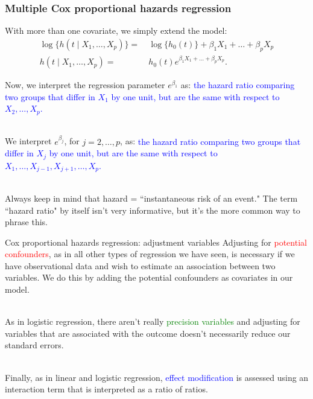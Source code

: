 \documentclass[10pt,t]{beamer}
\begin{document}
%
\begin{frame}
\frametitle{Multiple Cox proportional hazards regression}
With more than one covariate, we simply extend the model:
\begin{align*}
\log \{h(t \mid X_1, \dots, X_p)\} = & \ \log\{h_0(t)\} + \beta_1 X_1 + \dots + \beta_pX_p \\
h(t \mid X_1, \dots, X_p) = & \ h_0(t)e^{\beta_1X_1 + \dots + \beta_pX_p}.
\end{align*}
  
Now, we interpret the regression parameter $e^{\beta_1}$ as:   \textcolor{blue}{the hazard ratio comparing two groups that differ in $X_1$ by one unit, but are the same with respect to $X_2, \dots, X_p$.}   
\\ ~\ 

We interpret $e^{\beta_j}$, for $j = 2, \dots, p$, as:  
\textcolor{blue}{the hazard ratio comparing two groups that differ in $X_j$ by one unit, but are the same with respect to $X_1, \dots, X_{j-1}, X_{j+1}, \dots, X_p$.}   
\\ ~\

Always keep in mind that hazard = ``instantaneous risk of an event." The term ``hazard ratio" by itself isn't very informative, but it's the more common way to phrase this.
\end{frame}

\begin{frame}{Cox proportional hazards regression: adjustment variables}
	Adjusting for \textcolor{red}{potential confounders}, as in all other types of regression we have seen, is necessary if we have observational data and wish to estimate an association between two variables. We do this by adding the potential confounders as covariates in our model.
	\\ ~\ 
	
	As in logistic regression, there aren't really \textcolor{green}{precision variables} and adjusting for variables that are associated with the outcome doesn't necessarily reduce our standard errors.
	\\ ~\ 
	
	Finally, as in linear and logistic regression, \textcolor{blue}{effect modification} is assessed using an interaction term that is interpreted as a ratio of ratios.
\end{frame}
\end{document}
